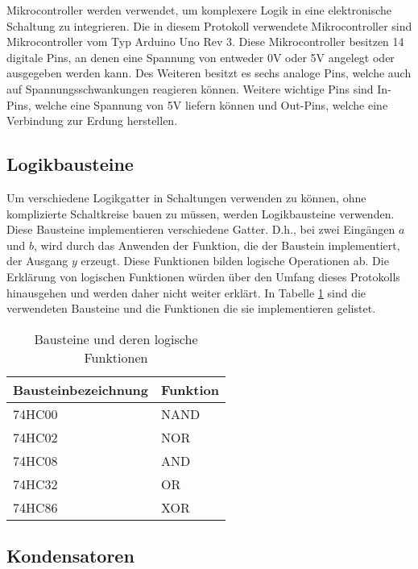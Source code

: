 Mikrocontroller werden verwendet, um komplexere Logik in eine elektronische Schaltung zu integrieren.
Die in diesem Protokoll verwendete Mikrocontroller sind Mikrocontroller vom Typ Arduino Uno Rev 3.
Diese Mikrocontroller besitzen 14 digitale Pins, an denen eine Spannung von entweder 0V oder 5V angelegt oder ausgegeben werden kann.
Des Weiteren besitzt es sechs analoge Pins, welche auch auf Spannungsschwankungen reagieren können.
Weitere wichtige Pins sind In-Pins, welche eine Spannung von 5V liefern können und Out-Pins, welche eine Verbindung zur Erdung herstellen.

\subsection{Logikbausteine}
\label{subsec:logikbausteine}

Um verschiedene Logikgatter in Schaltungen verwenden zu können, ohne komplizierte Schaltkreise bauen zu müssen, werden Logikbausteine verwenden.
Diese Bausteine implementieren verschiedene Gatter.
D.h., bei zwei Eingängen $a$ und $b$, wird durch das Anwenden der Funktion, die der Baustein implementiert, der Ausgang $y$ erzeugt.
Diese Funktionen bilden logische Operationen ab.
Die Erklärung von logischen Funktionen würden über den Umfang dieses Protokolls hinausgehen und werden daher nicht weiter erklärt.
In Tabelle \ref{tab:bausteine-und-deren-logische-funktionen} sind die verwendeten Bausteine und die Funktionen die sie implementieren gelistet.

\begin{table}[ht]
    \centering
    \caption{Bausteine und deren logische Funktionen}
    \label{tab:bausteine-und-deren-logische-funktionen}
    \begin{tabular}{| l | l |}
        \hline
        Bausteinbezeichnung & Funktion \\
        \hline
        74HC00              & NAND     \\
        74HC02              & NOR      \\
        74HC08              & AND      \\
        74HC32              & OR       \\
        74HC86              & XOR      \\
        \hline
    \end{tabular}
\end{table}

\subsection{Kondensatoren}
\label{subsec:kondensatoren}

